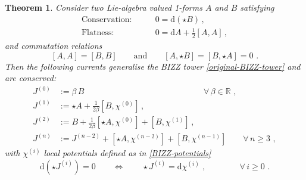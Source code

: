 \documentclass[12pt]{article}
\newtheorem{thm}{Theorem}[section]
\numberwithin{equation}{section}
\begin{document}
\begin{thm}\label{gBIZZ-theorem}
Consider two Lie-algebra valued 1-forms $A$ and $B$ satisfying
\begin{equation}\label{A,B-definition}
\begin{aligned}
\text{Conservation:}& \qquad
0=\mathrm{d}(\star B)  \, ,
\\
\text{Flatness:}& \qquad 0=\mathrm{d}A+\tfrac{1}{2}[A,A] \, ,
\end{aligned}
\end{equation}
and commutation relations
\begin{equation}\label{A,B-commutators}
[A,A]=[B,B]
\qquad \text{and} \qquad 
[A,\star B]=[B,\star A]=0 \,\, .
\end{equation}
Then the following currents generalise the BIZZ tower \eqref{original-BIZZ-tower} and are conserved:
\begin{equation}\label{generalised-BIZZ-tower}
\begin{aligned}
J^{(0)}&:=\beta \, B \qquad \qquad \qquad \qquad \qquad \qquad \quad \quad \,\, \forall \, \beta \in \mathbb{R}\,\, ,
\\
J^{(1)}&:= \star A + \tfrac{1}{2\beta}[B,\chi^{(0)}] \, ,
\\
J^{(2)}&:=B+\tfrac{1}{2\beta}[\star A,\chi^{(0)}]+[B,\chi^{(1)}] \, ,
\\
J^{(n)}&:=J^{(n-2)}+[\star A,\chi^{(n-2)}]+[B,\chi^{(n-1)}] \qquad \forall \, n\geq 3 \,\, ,
\end{aligned}
\end{equation}
with $\chi^{(i)}$ local potentials defined as in \eqref{BIZZ-potentials}
\begin{equation}\label{gBIZZ-potentials}
\mathrm{d}(\star J^{(i)})=0 
\qquad \Longleftrightarrow \qquad
\star J^{(i)}=\mathrm{d}\chi^{(i)} \,\, , 
\qquad \qquad \forall \, i\geq 0
\,\, .
\end{equation}
\end{thm}
\end{document}
